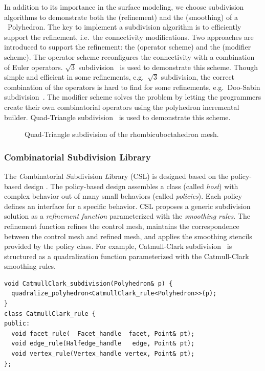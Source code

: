 \documentclass[twocolumn]{article}
\begin{document}
In addition to its importance in the surface modeling, we 
choose subdivision algorithms to demonstrate both the 
 (refinement) and the
 (smoothing) of a
\cgal\  Polyhedron. 
The key to implement a subdivision algorithm is to efficiently support
the refinement, i.e.\ the connectivity modifications. Two approaches
are introduced to support the refinement: the  (operator scheme) and
the  (modifier scheme). 
The operator scheme reconfigures the connectivity with a 
combination of Euler operators. $\sqrt{3}$ subdivision~\cite{sqrt3} is
used to demonstrate this scheme. Though simple and efficient in some
refinements, e.g.\ $\sqrt{3}$ subdivision, the correct combination of
the operators is hard to find for some refinements, e.g.\ Doo-Sabin
subdivision~\cite{ds}. The modifier scheme solves the problem by
letting the programmers create their own combinatorial operators 
using the polyhedron incremental builder. Quad-Triangle
subdivision~\cite{qts,l-pg-03} is used to demonstrate this scheme.


\begin{figure}[t]
    \caption{Quad-Triangle subdivision of the rhombicuboctahedron mesh.}
    \label{fig:quad-triangle}
\end{figure}


\subsubsection*{Combinatorial Subdivision Library}

The \emph{C}ombinatorial \emph{S}ubdivision \emph{L}ibrary 
(CSL) is designed based on the policy-based design 
\cite{Alexandrescu:2001:MCD}.
The policy-based design assembles a class
(called \emph{host}) with complex behavior out of many 
small behaviors (called \emph{policies}).
Each policy defines an interface for a
specific behavior. CSL proposes a 
generic subdivision solution as a \emph{refinement function}
parameterized with the \emph{smoothing rules}.
The refinement function refines the control mesh,
maintains the correspondence between the control mesh and refined
mesh, and applies the smoothing stencils provided by the policy
class. For example, Catmull-Clark subdivision~\cite{cc} is structured
as a quadralization function parameterized with the Catmull-Clark
smoothing rules.
\begin{lstlisting}
void CatmullClark_subdivision(Polyhedron& p) {    
  quadralize_polyhedron<CatmullClark_rule<Polyhedron>>(p);  
}
class CatmullClark_rule {
public:
  void facet_rule(  Facet_handle  facet, Point& pt);
  void edge_rule(Halfedge_handle   edge, Point& pt);
  void vertex_rule(Vertex_handle vertex, Point& pt);
};
\end{lstlisting}
\end{document}
